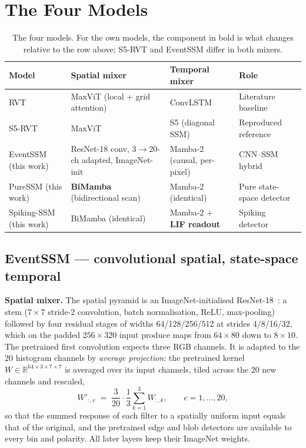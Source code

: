\documentclass[11pt, a4paper]{report}
\begin{document}
\section{The Four Models}
\label{sec:four_models}

\begin{table}[htbp]
\centering
\caption{The four models. For the own models, the component in bold is what changes relative to the row
above; S5-RVT and EventSSM differ in both mixers.}
\label{tab:four_models}
\begin{tabularx}{\textwidth}{@{}lXXX@{}}
\toprule
\textbf{Model} & \textbf{Spatial mixer} & \textbf{Temporal mixer} & \textbf{Role} \\
\midrule
RVT & MaxViT (local + grid attention) & ConvLSTM & Literature baseline \\
S5-RVT & MaxViT & S5 (diagonal SSM) & Reproduced reference \\
EventSSM (this work) & ResNet-18 conv, 3$\to$20-ch adapted, ImageNet-init & Mamba-2 (causal, per-pixel) & CNN--SSM hybrid \\
PureSSM (this work) & \textbf{BiMamba} (bidirectional scan) & Mamba-2 (identical) & Pure state-space detector \\
Spiking-SSM (this work) & BiMamba (identical) & Mamba-2 $+$ \textbf{LIF readout} & Spiking detector \\
\bottomrule
\end{tabularx}
\end{table}

\subsection{EventSSM --- convolutional spatial, state-space temporal}
\label{subsec:eventssm}
\textbf{Spatial mixer.} The spatial pyramid is an ImageNet-initialised ResNet-18~\cite{he2016deep}: a stem
($7\times7$ stride-2 convolution, batch normalisation, ReLU, max-pooling) followed by four residual stages
of widths 64/128/256/512 at strides 4/8/16/32, which on the padded $256\times320$ input produce maps from
$64\times80$ down to $8\times10$. The pretrained first convolution expects three RGB channels. It is
adapted to the 20 histogram channels by \emph{average projection}: the pretrained kernel
$W\in\mathbb{R}^{64\times3\times7\times7}$ is averaged over its input channels, tiled across the 20 new
channels and rescaled,
\begin{equation}
  W'_{:,c} \;=\; \frac{3}{20}\cdot\frac{1}{3}\sum_{k=1}^{3} W_{:,k}, \qquad c = 1,\dots,20,
  \label{eq:avg_projection}
\end{equation}
so that the summed response of each filter to a spatially uniform input equals that of the original, and
the pretrained edge and blob detectors are available to every bin and polarity. All later layers keep
their ImageNet weights.
\end{document}
